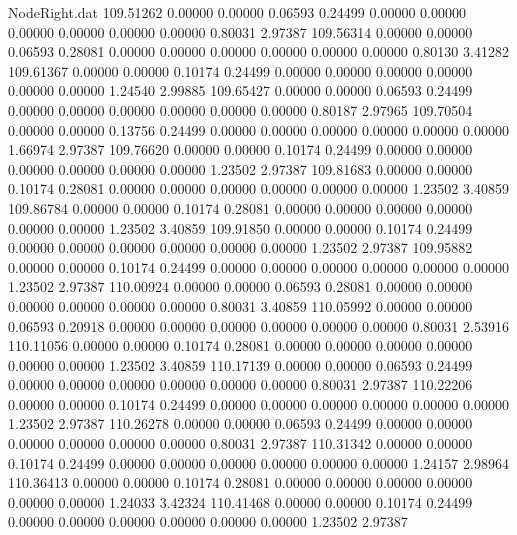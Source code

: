 \begin{filecontents}{NodeRight.dat}
 109.51262    0.00000    0.00000     0.06593    0.24499    0.00000    0.00000    0.00000    0.00000    0.00000    0.00000    0.80031    2.97387
 109.56314    0.00000    0.00000     0.06593    0.28081    0.00000    0.00000    0.00000    0.00000    0.00000    0.00000    0.80130    3.41282
 109.61367    0.00000    0.00000     0.10174    0.24499    0.00000    0.00000    0.00000    0.00000    0.00000    0.00000    1.24540    2.99885
 109.65427    0.00000    0.00000     0.06593    0.24499    0.00000    0.00000    0.00000    0.00000    0.00000    0.00000    0.80187    2.97965
 109.70504    0.00000    0.00000     0.13756    0.24499    0.00000    0.00000    0.00000    0.00000    0.00000    0.00000    1.66974    2.97387
 109.76620    0.00000    0.00000     0.10174    0.24499    0.00000    0.00000    0.00000    0.00000    0.00000    0.00000    1.23502    2.97387
 109.81683    0.00000    0.00000     0.10174    0.28081    0.00000    0.00000    0.00000    0.00000    0.00000    0.00000    1.23502    3.40859
 109.86784    0.00000    0.00000     0.10174    0.28081    0.00000    0.00000    0.00000    0.00000    0.00000    0.00000    1.23502    3.40859
 109.91850    0.00000    0.00000     0.10174    0.24499    0.00000    0.00000    0.00000    0.00000    0.00000    0.00000    1.23502    2.97387
 109.95882    0.00000    0.00000     0.10174    0.24499    0.00000    0.00000    0.00000    0.00000    0.00000    0.00000    1.23502    2.97387
 110.00924    0.00000    0.00000     0.06593    0.28081    0.00000    0.00000    0.00000    0.00000    0.00000    0.00000    0.80031    3.40859
 110.05992    0.00000    0.00000     0.06593    0.20918    0.00000    0.00000    0.00000    0.00000    0.00000    0.00000    0.80031    2.53916
 110.11056    0.00000    0.00000     0.10174    0.28081    0.00000    0.00000    0.00000    0.00000    0.00000    0.00000    1.23502    3.40859
 110.17139    0.00000    0.00000     0.06593    0.24499    0.00000    0.00000    0.00000    0.00000    0.00000    0.00000    0.80031    2.97387
 110.22206    0.00000    0.00000     0.10174    0.24499    0.00000    0.00000    0.00000    0.00000    0.00000    0.00000    1.23502    2.97387
 110.26278    0.00000    0.00000     0.06593    0.24499    0.00000    0.00000    0.00000    0.00000    0.00000    0.00000    0.80031    2.97387
 110.31342    0.00000    0.00000     0.10174    0.24499    0.00000    0.00000    0.00000    0.00000    0.00000    0.00000    1.24157    2.98964
 110.36413    0.00000    0.00000     0.10174    0.28081    0.00000    0.00000    0.00000    0.00000    0.00000    0.00000    1.24033    3.42324
 110.41468    0.00000    0.00000     0.10174    0.24499    0.00000    0.00000    0.00000    0.00000    0.00000    0.00000    1.23502    2.97387

\end{filecontents}
